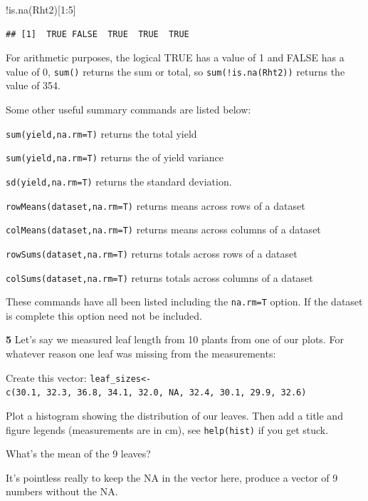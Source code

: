 \documentclass[
]{book}
\makeatletter
\newenvironment{Shaded}{\begin{snugshade}}{\end{snugshade}}
\newcommand{\DecValTok}[1]{\textcolor[rgb]{0.00,0.00,0.81}{#1}}
\newcommand{\FunctionTok}[1]{\textcolor[rgb]{0.00,0.00,0.00}{#1}}
\newcommand{\NormalTok}[1]{#1}
\newcommand{\SpecialCharTok}[1]{\textcolor[rgb]{0.00,0.00,0.00}{#1}}
\newenvironment{kframe}{%
\medskip{}
\setlength{\fboxsep}{.8em}
 \def\at@end@of@kframe{}%
 \ifinner\ifhmode%
  \def\at@end@of@kframe{\end{minipage}}%
  \begin{minipage}{\columnwidth}%
 \fi\fi%
 \def\FrameCommand##1{\hskip\@totalleftmargin \hskip-\fboxsep
 \colorbox{shadecolor}{##1}\hskip-\fboxsep
     \hskip-\linewidth \hskip-\@totalleftmargin \hskip\columnwidth}%
 \MakeFramed {\advance\hsize-\width
   \@totalleftmargin\z@ \linewidth\hsize
   \@setminipage}}%
 {\par\unskip\endMakeFramed%
 \at@end@of@kframe}
\newenvironment{rmdblock}[1]
  {
  \begin{itemize}
  \renewcommand{\labelitemi}{
    \raisebox{-.7\height}[0pt][0pt]{
      {\setkeys{Gin}{width=3em,keepaspectratio}\texttt{[image: images/\#1]}}
    }
  }
  \setlength{\fboxsep}{1em}
  \begin{kframe}
  \item
  }
  {
  \end{kframe}
  \end{itemize}
  }
\newenvironment{rmdquiz}
  {\begin{rmdblock}{quiz}}
  {\end{rmdblock}}
\makeatother
\begin{document}
\begin{Shaded}
\begin{Highlighting}[]
\SpecialCharTok{!}\FunctionTok{is.na}\NormalTok{(Rht2)[}\DecValTok{1}\SpecialCharTok{:}\DecValTok{5}\NormalTok{]}
\end{Highlighting}
\end{Shaded}

\begin{verbatim}
## [1]  TRUE FALSE  TRUE  TRUE  TRUE
\end{verbatim}

For arithmetic purposes, the logical TRUE has a value of 1 and FALSE has a value of 0, \texttt{sum()} returns the sum or total, so \texttt{sum(!is.na(Rht2))} returns the value of 354.

Some other useful summary commands are listed below:

\texttt{sum(yield,na.rm=T)} returns the total yield

\texttt{sum(yield,na.rm=T)} returns the of yield variance

\texttt{sd(yield,na.rm=T)} returns the standard deviation.

\texttt{rowMeans(dataset,na.rm=T)} returns means across rows of a dataset

\texttt{colMeans(dataset,na.rm=T)} returns means across columns of a dataset

\texttt{rowSums(dataset,na.rm=T)} returns totals across rows of a dataset

\texttt{colSums(dataset,na.rm=T)} returns totals across columns of a dataset

These commands have all been listed including the \texttt{na.rm=T} option. If the dataset is complete this option need not be included.

\begin{rmdquiz}
\textbf{5} Let's say we measured leaf length from 10 plants from one of our plots. For whatever reason one leaf was missing from the measurements:

Create this vector: \texttt{leaf\_sizes\textless{}-c(30.1,\ 32.3,\ 36.8,\ 34.1,\ 32.0,\ NA,\ 32.4,\ 30.1,\ 29.9,\ 32.6)}

Plot a histogram showing the distribution of our leaves. Then add a title and figure legends (measurements are in cm), see \texttt{help(hist)} if you get stuck.

What's the mean of the 9 leaves?

It's pointless really to keep the NA in the vector here, produce a vector of 9 numbers without the NA.\\
\end{rmdquiz}
\end{document}
